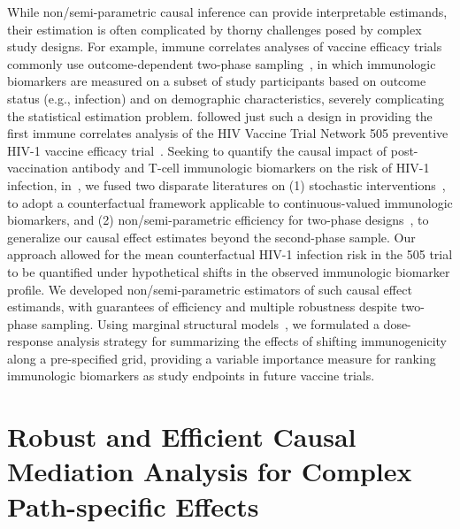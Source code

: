 While non/semi-parametric causal inference can provide interpretable estimands,
their estimation is often complicated by thorny challenges posed by complex
study designs. For example, immune correlates analyses of vaccine efficacy
trials commonly use outcome-dependent two-phase
sampling~\citep{haynes2012immune}, in which immunologic biomarkers are measured
on a subset of study participants based on outcome status (e.g., infection) and
on demographic characteristics, severely complicating the statistical estimation
problem. \citet{janes2017higher} followed just such a design in providing the
first immune correlates analysis of the HIV Vaccine Trial Network 505 preventive
HIV-1 vaccine efficacy trial~\citep{hammer2013efficacy}. Seeking to quantify the
causal impact of post-vaccination antibody and T-cell immunologic biomarkers on
the risk of HIV-1 infection, in~\citet{hejazi2020efficient}, we fused two
disparate literatures on (1) stochastic
interventions~\citep{stock1989nonparametric,diaz2012population}, to adopt
a counterfactual framework applicable to continuous-valued immunologic
biomarkers, and (2) non/semi-parametric efficiency for two-phase
designs~\citep{breslow2003large,rose2011targeted2sd}, to generalize our causal
effect estimates beyond the second-phase sample.
Our approach allowed for the mean counterfactual HIV-1 infection risk in the 505
trial to be quantified under hypothetical shifts in the observed immunologic
biomarker profile. We developed non/semi-parametric estimators of such causal
effect estimands, with guarantees of efficiency and multiple robustness despite
two-phase sampling. Using marginal structural
models~\citep{neugebauer2007nonparametric}, we formulated a dose-response
analysis strategy for summarizing the effects of shifting immunogenicity along
a pre-specified grid, providing a variable importance measure for ranking
immunologic biomarkers as study endpoints in future vaccine trials.

\section{Robust and Efficient Causal Mediation Analysis for Complex
  Path-specific Effects}

